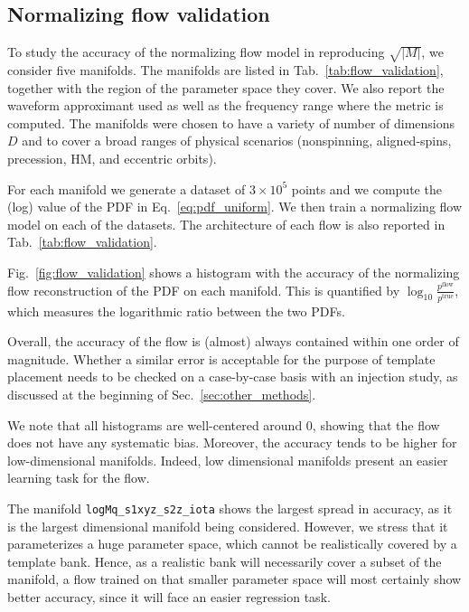 \documentclass[twocolumn,showpacs,preprintnumbers,nofootinbib,prd,
superscriptaddress,10pt]{revtex4-2}
\begin{document}
\subsection{Normalizing flow validation} \label{sec:flow_validation}

To study the accuracy of the normalizing flow model in reproducing $\sqrt{|M|}$, we consider five manifolds. The manifolds are listed in Tab.~\ref{tab:flow_validation}, together with the region of the parameter space they cover. We also report the waveform approximant used as well as the frequency range where the metric is computed.
The manifolds were chosen to have a variety of number of dimensions $D$ and to cover a broad ranges of physical scenarios (nonspinning, aligned-spins, precession, HM, and eccentric orbits).

For each manifold we generate a dataset of $3\times 10^5$ points and we compute the (log) value of the PDF in Eq.~\eqref{eq:pdf_uniform}. We then train a normalizing flow model on each of the datasets.
The architecture of each flow is also reported in Tab.~\ref{tab:flow_validation}.

Fig.~\ref{fig:flow_validation} shows a histogram with the accuracy of the normalizing flow reconstruction of the PDF on each manifold. This is quantified by $\log_{10}\frac{p^\mathrm{flow}}{p^\mathrm{true}}$, which measures the logarithmic ratio between the two PDFs.

Overall, the accuracy of the flow is (almost) always contained within one order of magnitude. Whether a similar error is acceptable for the purpose of template placement needs to be checked on a case-by-case basis with an injection study, as discussed at the beginning of Sec.~\ref{sec:other_methods}.

We note that all histograms are well-centered around $0$, showing that the flow does not have any systematic bias. Moreover, the accuracy tends to be higher for low-dimensional manifolds. Indeed, low dimensional manifolds present an easier learning task for the flow.

The manifold \texttt{logMq\_s1xyz\_s2z\_iota} shows the largest spread in accuracy, as it is the largest dimensional manifold being considered. However, we stress that it parameterizes a huge parameter space, which cannot be realistically covered by a template bank. Hence, as a realistic bank will necessarily cover a subset of the manifold, a flow trained on that smaller parameter space will most certainly show better accuracy, since it will face an easier regression task.
\end{document}
